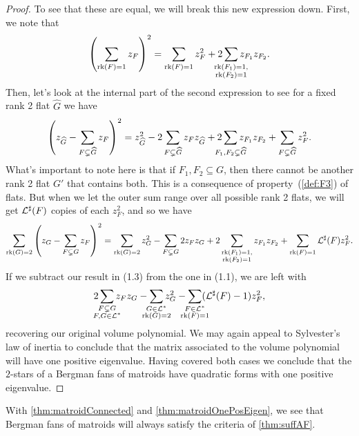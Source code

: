 \documentclass[12pt,oneside]{../../sfsuthesis}
\begin{document}
\begin{proof}
    To see that these are equal, we will break this new expression down.
    First, we note that
    \begin{equation}
        \left( \sum_{\rk(F) = 1} z_F\right)^2 = \sum_{\rk(F) = 1} z_F^2 + 2\sum_{\mathclap{\substack{\rk(F_1) = 1, \\ \rk(F_2) = 1}}} z_{F_1}z_{F_2}.
    \end{equation}
    Then, let's look at the internal part of the second expression to see for a fixed rank 2 flat \( \hat{G} \) we have
    \begin{equation}
        \left( z_{\hat{G}} - \sum_{F \subsetneq {\hat{G}}} z_F \right)^2
        = z_{\hat{G}}^2 - 2\sum_{F \subsetneq \hat{G}} z_F z_{\hat{G}} + 2\sum_{\mathclap{F_1,F_2 \subsetneq \hat{G}}}z_{F_1} z_{F_2} + \sum_{F \subsetneq \hat{G}} z_F^2.
    \end{equation}
    What's important to note here is that if \( F_1, F_2 \subseteq G \), then there cannot be another rank 2 flat \( G' \) that contains both.
    This is a consequence of property~(\ref{def:F3}) of flats.
    But when we let the outer sum range over all possible rank 2 flats, we will get \( \mathcal{L}^\sharp(F) \) copies of each \( z_F^2 \), and so we have
    \begin{equation}
        \sum_{\operatorname{rk}(G) = 2} \left( z_G - \sum_{F \subsetneq G} z_F\right)^2 =
        \sum_{\operatorname{rk}(G)=2}z_G^2
        - \sum_{F \subsetneq G}2 z_F z_{G}
        + 2\sum_{\substack{\operatorname{rk}(F_1) = 1, \\ \operatorname{rk}(F_2) = 1}}z_{F_1} z_{F_2}
        + \sum_{\operatorname{rk}(F) = 1} \mathcal{L}^\sharp(F)z_F^2.
    \end{equation}
    If we subtract our result in (1.3) from the one in (1.1), we are left with
    \[
        2\sum_{\mathclap{\substack{F \subsetneq G \\ F,G \in \cL^\ast}}} z_F z_G - \sum_{\mathclap{\substack{G \in \cL^\ast \\ \rk(G)=2}}} z_G^2 - \sum_{\mathclap{\substack{F \in \cL^\ast \\ \rk(F)=1}}}(\cL^\sharp(F) - 1)z_F^2,
    \]
    recovering our original volume polynomial.
    We may again appeal to Sylvester's law of inertia to conclude that the matrix associated to the volume polynomial will have one positive eigenvalue.
    Having covered both cases we conclude that the \( 2 \)-stars of a Bergman fans of matroids have quadratic forms with one positive eigenvalue.
\end{proof}

With \th\ref{thm:matroidConnected} and \th\ref{thm:matroidOnePosEigen}, we see that Bergman fans of matroids will always satisfy the criteria of \th\ref{thm:suffAF}.
\end{document}
